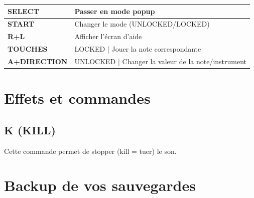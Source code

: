 \documentclass[12pt,a4paper]{article}
\begin{document}
        \tablelasttail{\hline}
        \begin{supertabular}{|l|p{11cm}|}
        \hline
            {\bf SELECT} & Passer en mode popup \\
            \hline
            {\bf START} & Changer le mode (UNLOCKED/LOCKED) \\
            \hline
            {\bf R+L} & Afficher l'écran d'aide \\
            \hline
            {\bf TOUCHES} & LOCKED | Jouer la note correspondante \\
            \hline
            {\bf A+DIRECTION} & UNLOCKED | Changer la valeur de la note/instrument \\ 
        \hline
        \end{supertabular}
    
  \section{Effets et commandes}
  
  
  \subsection{K (KILL)}
  
  Cette commande permet de stopper (kill = tuer) le son. 
  
  
  
  \section{Backup de vos sauvegardes}\label{burger}
  
\end{document}
